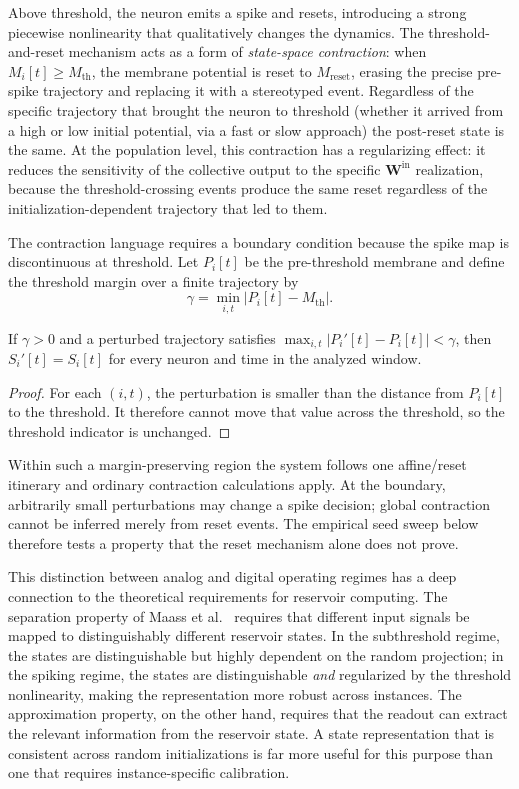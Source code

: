 Above threshold, the neuron emits a spike and resets, introducing a strong piecewise nonlinearity that qualitatively changes the dynamics. The threshold-and-reset mechanism acts as a form of \emph{state-space contraction}: when $M_i[t] \geq M_{\text{th}}$, the membrane potential is reset to $M_{\text{reset}}$, erasing the precise pre-spike trajectory and replacing it with a stereotyped event. Regardless of the specific trajectory that brought the neuron to threshold (whether it arrived from a high or low initial potential, via a fast or slow approach) the post-reset state is the same. At the population level, this contraction has a regularizing effect: it reduces the sensitivity of the collective output to the specific $\mathbf{W}^{\text{in}}$ realization, because the threshold-crossing events produce the same reset regardless of the initialization-dependent trajectory that led to them.

The contraction language requires a boundary condition because the spike map is
discontinuous at threshold. Let $P_i[t]$ be the pre-threshold membrane and define
the threshold margin over a finite trajectory by
\begin{equation}
\gamma=\min_{i,t}|P_i[t]-M_{\mathrm{th}}|.
\end{equation}

\begin{lemma}
\label{lem:spike_margin}
If $\gamma>0$ and a perturbed trajectory satisfies
$\max_{i,t}|P_i'[t]-P_i[t]|<\gamma$, then
$S_i'[t]=S_i[t]$ for every neuron and time in the analyzed window.
\end{lemma}

\begin{proof}
For each $(i,t)$, the perturbation is smaller than the distance from $P_i[t]$ to
the threshold. It therefore cannot move that value across the threshold, so the
threshold indicator is unchanged.
\end{proof}

Within such a margin-preserving region the system follows one affine/reset
itinerary and ordinary contraction calculations apply. At the boundary,
arbitrarily small perturbations may change a spike decision; global contraction
cannot be inferred merely from reset events. The empirical seed sweep below
therefore tests a property that the reset mechanism alone does not prove.

This distinction between analog and digital operating regimes has a deep connection to the theoretical requirements for reservoir computing. The separation property of Maass et al.\ \cite{Maass2002RealTime} requires that different input signals be mapped to distinguishably different reservoir states. In the subthreshold regime, the states are distinguishable but highly dependent on the random projection; in the spiking regime, the states are distinguishable \emph{and} regularized by the threshold nonlinearity, making the representation more robust across instances. The approximation property, on the other hand, requires that the readout can extract the relevant information from the reservoir state. A state representation that is consistent across random initializations is far more useful for this purpose than one that requires instance-specific calibration.

